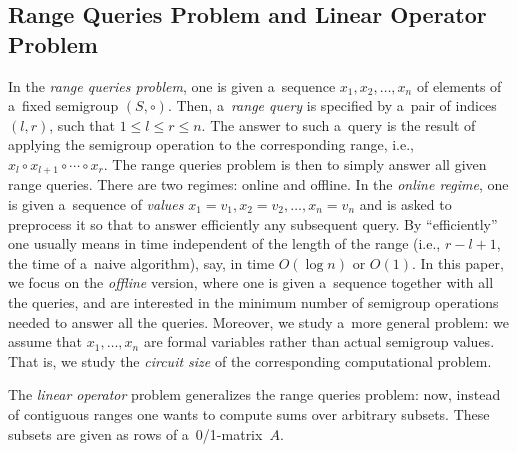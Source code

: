 \documentclass[review,onefignum,onetabnum]{siamart190516}
\begin{document}
\subsection{Range Queries Problem and Linear Operator Problem}
In the {\em range queries problem}, one is given
a~sequence $x_1, x_2, \dotsc, x_n$ of
elements of a~fixed semigroup $(S, \circ)$.
Then, a~\emph{range query} is
specified by a~pair of indices $(l,r)$, such that $1 \le l \le r \le n$.
The answer to such a~query is the result of applying the semigroup
operation to the
corresponding range, i.e., $x_l \circ x_{l+1} \circ \dotsb \circ x_r$.
The range queries problem is then to simply answer all given range
queries.
There are two
regimes: online and offline. In the {\em online regime}, one is given
a~sequence of {\em values}
$x_1=v_1, x_2=v_2, \dotsc, x_n=v_n$ and is asked to preprocess
it so that to
answer efficiently any subsequent query.
By ``efficiently'' one usually
means in time independent of the length of the range
(i.e., $r-l+1$, the time
of a~naive algorithm), say, in time $O(\log n)$ or $O(1)$.
In this paper, we
focus on the {\em offline} version, where one is given a~sequence
together with
all the queries, and are interested in the minimum number of
semigroup
operations needed to answer all the queries. Moreover, we study
a~more general
problem: we assume that $x_1, \dotsc, x_n$ are formal variables
rather than
actual semigroup values. That is, we study the {\em circuit size} of
the corresponding
computational problem.

The {\em linear operator} problem generalizes the range
queries problem: now, instead of contiguous ranges one wants
to compute sums over arbitrary subsets. These subsets are
given as rows of a~0/1-matrix~$A$.
\end{document}
